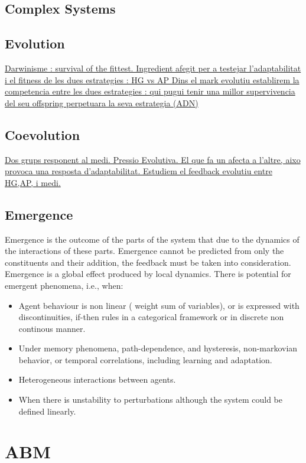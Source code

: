 \documentclass{report}
\begin{document}
\subsection{Complex Systems}

\subsection{Evolution}
\underline{	Darwinisme : survival of the fittest.
		Ingredient afegit per a testejar l'adaptabilitat i el fitness de les dues estrategies : HG vs AP
		Dins el mark evolutiu establirem la competencia entre les dues estrategies : qui pugui tenir una
		millor supervivencia del seu offspring perpetuara  la seva estrategia (ADN)
		}
\subsection{Coevolution}
\underline{	Dos grups responent al medi. Pressio Evolutiva. El que fa un afecta a l'altre, aixo provoca una
		resposta d'adaptabilitat. Estudiem el feedback evolutiu entre HG,AP, i medi.
		}

\subsection{Emergence}
Emergence is the outcome of the parts of the system that due to the dynamics of the interactions of these parts. Emergence cannot be predicted from only the constituents and their addition, the feedback must be taken into consideration. Emergence is a global effect produced by local dynamics.  
There is potential for emergent phenomena, i.e., when: 
\begin{itemize}
 \item Agent behaviour is non linear ( weight sum of variables), or is expressed with discontinuities, if-then rules in a categorical framework or in discrete non continous manner.
 \item Under memory phenomena, path-dependence, and hysteresis, non-markovian behavior, or temporal correlations, including learning and adaptation. 
 \item Heterogeneous interactions between agents.
 \item When there is unstability to perturbations although the system could be defined linearly.
\end{itemize}


\section{ABM}
\end{document}
